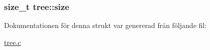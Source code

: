 \subsubsection[{\texorpdfstring{size}{size}}]{\setlength{\rightskip}{0pt plus 5cm}size\+\_\+t tree\+::size}\hypertarget{structtree_a794fa86f6b2815f255a79b3a46fdb190}{}\label{structtree_a794fa86f6b2815f255a79b3a46fdb190}


Dokumentationen för denna strukt var genererad från följande fil\+:\begin{DoxyCompactItemize}
\item 
\hyperlink{tree_8c}{tree.\+c}\end{DoxyCompactItemize}

